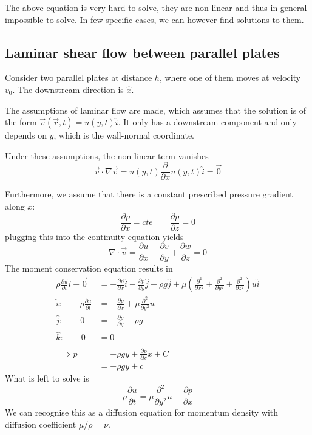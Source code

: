 The above equation is very hard to solve, they are non-linear and thus in general impossible to solve. In few specific cases, we can however find solutions to them.
\subsection{Laminar shear flow between parallel plates}
Consider two parallel plates at distance $h$, where one of them moves at velocity $v_0$. The downstream direction is $\hat x$. 

The assumptions of laminar flow are made, which assumes that the solution is of the form $\vec v (\vec r,t)= u(y,t)\hat i$. It only has a downstream component and only depends on $y$, which is the wall-normal coordinate. 

Under these assumptions, the non-linear term vanishes
\begin{equation*}
	\vec v \cdot \nabla \vec v = u(y,t)\frac{\partial}{\partial x}u(y,t)\hat i = \vec 0
\end{equation*}

Furthermore, we assume that there is a constant prescribed pressure gradient along $x$:
\begin{equation*}
	\frac{\partial p}{\partial x} = cte\qquad \frac{\partial p}{\partial z} = 0
\end{equation*}
plugging this into the continuity equation yields
\begin{equation*}
	\nabla \cdot \vec v = \frac{\partial u}{\partial x} + \frac{\partial v}{\partial y} + \frac{\partial w}{\partial z} = 0
\end{equation*}
The moment conservation equation results in
\begin{equation*}
	\begin{split}
		\rho \frac{\partial u}{\partial t}\hat i + \vec 0 &= - \frac{\partial p}{\partial x}\hat i - \frac{\partial p}{\partial y}\hat j - \rho g\hat j + \mu \left(\frac{\partial^2 }{\partial x^2 }+\frac{\partial^2 }{\partial y^2 }+\frac{\partial^2 }{\partial z^2 }\right)u \hat i\\
		\hat i: \qquad \rho \frac{\partial u}{\partial t}&=-\frac{\partial p}{\partial x}+ \mu \frac{\partial^2 }{\partial y^2}u\\
		\hat j:\qquad 0 &= -\frac{\partial p}{\partial y}-\rho g\\
		\hat k: \qquad 0 &= 0\\\\
		\implies p &= -\rho g y + \frac{\partial p}{\partial x}x + C\\
		&= -\rho g y + c
	\end{split}
\end{equation*}
What is left to solve is
\begin{equation*}
	\rho \frac{\partial u}{\partial t} = \mu \frac{\partial ^2}{\partial y^2}u - \frac{\partial p}{\partial x}
\end{equation*}
We can recognise this as a diffusion equation for momentum density with diffusion coefficient $\mu/\rho = \nu$.

